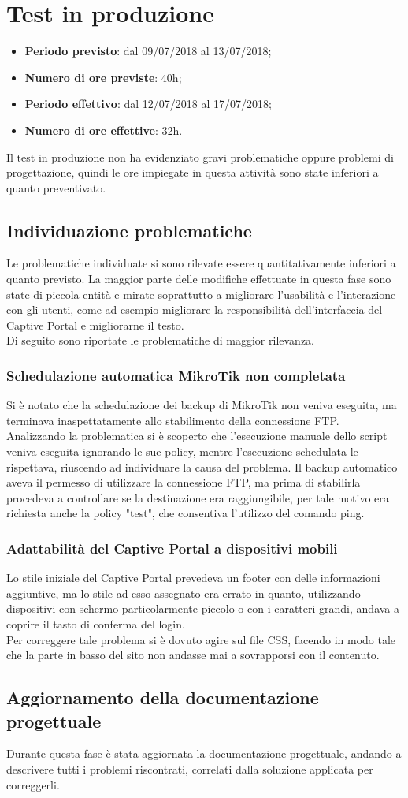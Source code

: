 \documentclass[Realizzazione.tex]{subfiles}
\begin{document}
\section{Test in produzione}
\begin{itemize}
	\item \textbf{Periodo previsto}: dal 09/07/2018 al 13/07/2018;
	\item \textbf{Numero di ore previste}: 40h;
	\item \textbf{Periodo effettivo}: dal 12/07/2018 al 17/07/2018;
	\item \textbf{Numero di ore effettive}: 32h.
\end{itemize}
Il test in produzione non ha evidenziato gravi problematiche oppure problemi di progettazione, quindi le ore impiegate in questa attività sono state inferiori a quanto preventivato.

\subsection{Individuazione problematiche}
Le problematiche individuate si sono rilevate essere quantitativamente inferiori a quanto previsto. La maggior parte delle modifiche effettuate in questa fase sono state di piccola entità e mirate soprattutto a migliorare l'usabilità e l'interazione con gli utenti, come ad esempio migliorare la responsibilità dell'interfaccia del Captive Portal e migliorarne il testo.\\
Di seguito sono riportate le problematiche di maggior rilevanza.

\subsubsection{Schedulazione automatica MikroTik non completata}
Si è notato che la schedulazione dei backup di MikroTik non veniva eseguita, ma terminava inaspettatamente allo stabilimento della connessione FTP. \\
Analizzando la problematica si è scoperto che l'esecuzione manuale dello script veniva eseguita ignorando le sue policy, mentre l'esecuzione schedulata le rispettava, riuscendo ad individuare la causa del problema.
Il backup automatico aveva il permesso di utilizzare la connessione FTP, ma prima di stabilirla procedeva a controllare se la destinazione era raggiungibile, per tale motivo era richiesta anche la policy "test", che consentiva l'utilizzo del comando ping.

\subsubsection{Adattabilità del Captive Portal a dispositivi mobili}
Lo stile iniziale del Captive Portal prevedeva un footer con delle informazioni aggiuntive, ma lo stile ad esso assegnato era errato in quanto, utilizzando dispositivi con schermo particolarmente piccolo o con i caratteri grandi, andava a coprire il tasto di conferma del login. \\
Per correggere tale problema si è dovuto agire sul file CSS, facendo in modo tale che la parte in basso del sito non andasse mai a sovrapporsi con il contenuto.

\subsection{Aggiornamento della documentazione progettuale}
Durante questa fase è stata aggiornata la documentazione progettuale, andando a descrivere tutti i problemi riscontrati, correlati dalla soluzione applicata per correggerli.
\end{document}
